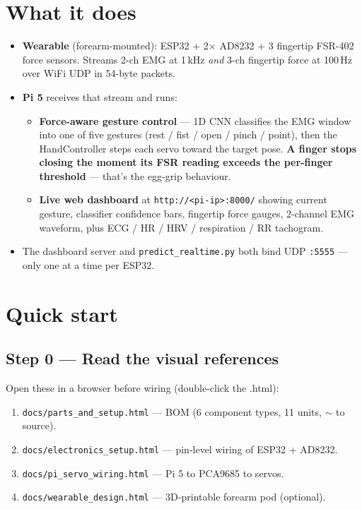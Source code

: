 \documentclass[10pt, a4paper]{article}
\begin{document}
\section*{What it does}

\begin{itemize}
  \item \textbf{Wearable} (forearm-mounted): ESP32 + 2$\times$ AD8232 + 3 fingertip FSR-402 force sensors. Streams 2-ch EMG at 1\,kHz \emph{and} 3-ch fingertip force at 100\,Hz over WiFi UDP in 54-byte packets.
  \item \textbf{Pi 5} receives that stream and runs:
  \begin{itemize}
    \item \textbf{Force-aware gesture control} — 1D CNN classifies the EMG window into one of five gestures (rest / fist / open / pinch / point), then the HandController steps each servo toward the target pose. \textbf{A finger stops closing the moment its FSR reading exceeds the per-finger threshold} — that's the egg-grip behaviour.
    \item \textbf{Live web dashboard} at \texttt{http://<pi-ip>:8000/} showing current gesture, classifier confidence bars, fingertip force gauges, 2-channel EMG waveform, plus ECG / HR / HRV / respiration / RR tachogram.
  \end{itemize}
  \item The dashboard server and \texttt{predict\_realtime.py} both bind UDP \texttt{:5555} --- only one at a time per ESP32.
\end{itemize}

\section*{Quick start}

\subsection*{Step 0 --- Read the visual references}

Open these in a browser before wiring (double-click the .html):

\begin{enumerate}
  \item \texttt{docs/parts\_and\_setup.html} --- BOM (6 component types, 11 units, $\sim$ to source).
  \item \texttt{docs/electronics\_setup.html} --- pin-level wiring of ESP32 + AD8232.
  \item \texttt{docs/pi\_servo\_wiring.html} --- Pi 5 to PCA9685 to servos.
  \item \texttt{docs/wearable\_design.html} --- 3D-printable forearm pod (optional).
\end{enumerate}
\end{document}
